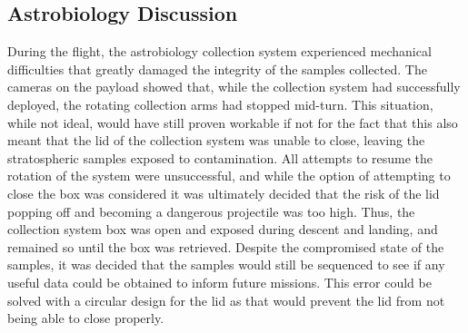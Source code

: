 \subsection{Astrobiology Discussion}
\label{sec:Astrobiology-Discussion}

During the flight, the astrobiology collection system experienced mechanical difficulties that greatly damaged the integrity of the samples collected. The cameras on the payload showed that, while the collection system had successfully deployed, the rotating collection arms had stopped mid-turn. This situation, while not ideal, would have still proven workable if not for the fact that this also meant that the lid of the collection system was unable to close, leaving the stratospheric samples exposed to contamination. All attempts to resume the rotation of the system were unsuccessful, and while the option of attempting to close the box was considered it was ultimately decided that the risk of the lid popping off and becoming a dangerous projectile was too high. Thus, the collection system box was open and exposed during descent and landing, and remained so until the box was retrieved. Despite the compromised state of the samples, it was decided that the samples would still be sequenced to see if any useful data could be obtained to inform future missions. This error could be solved with a circular design for the lid as that would prevent the lid from not being able to close properly.
